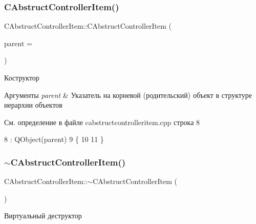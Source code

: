 \subsubsection{\texorpdfstring{C\+Abstruct\+Controller\+Item()}{CAbstructControllerItem()}}
{\footnotesize\ttfamily C\+Abstruct\+Controller\+Item\+::\+C\+Abstruct\+Controller\+Item (\begin{DoxyParamCaption}\item[{Q\+Object $\ast$}]{parent = {} }\end{DoxyParamCaption})\hspace{0.3cm}{\ttfamily [explicit]}}



Коструктор 


\begin{DoxyParams}{Аргументы}
{\em parent} & Указатель на корневой (родительский) объект в структуре иерархии объектов \\
\hline
\end{DoxyParams}


См. определение в файле cabstructcontrolleritem.\+cpp строка 8


\begin{DoxyCode}
8                                                                 : QObject(parent)
9 \{
10 
11 \}
\end{DoxyCode}
\hypertarget{class_c_abstruct_controller_item_a807bca71bd9a2966e60ec5c3c807f359}{}\label{class_c_abstruct_controller_item_a807bca71bd9a2966e60ec5c3c807f359} 
\subsubsection{\texorpdfstring{$\sim$\+C\+Abstruct\+Controller\+Item()}{~CAbstructControllerItem()}}
{\footnotesize\ttfamily C\+Abstruct\+Controller\+Item\+::$\sim$\+C\+Abstruct\+Controller\+Item (\begin{DoxyParamCaption}{ }\end{DoxyParamCaption})\hspace{0.3cm}{\ttfamily [virtual]}}



Виртуальный деструктор 



